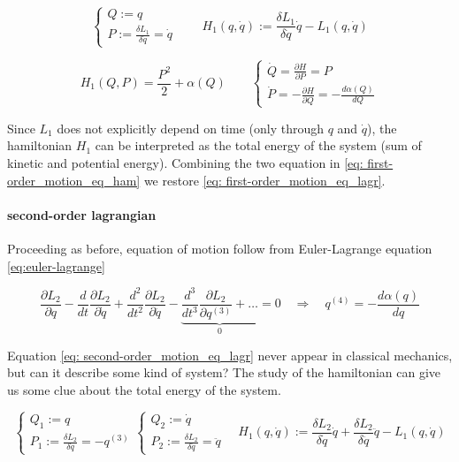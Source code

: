 \begin{equation*}
  \begin{cases}
    Q := q \\
    P := \frac{\delta L_1}{\delta \dot{q}} = \dot{q}
  \end{cases}
  \qquad
  H_1(q, \dot{q}) := \frac{\delta L_1}{\delta \dot{q}} \dot{q} - L_1(q, \dot{q})
\end{equation*}

\begin{equation} \label{eq: first-order_motion_eq_ham}
  H_1(Q, P) = \frac{P^2}{2} + \alpha(Q) \qquad
  \begin{cases}
    \dot{Q} =   \frac{\partial H}{\partial P} = P \\
    \dot{P} = - \frac{\partial H}{\partial Q} = - \frac{d\alpha(Q)}{dQ}
  \end{cases}
\end{equation}

Since $L_1$ does not explicitly depend on time (only through $q$ and $\dot{q}$),
the hamiltonian $H_1$ can be interpreted as the total energy of the system (sum of
kinetic and potential energy).  Combining the two equation in \eqref{eq:
first-order_motion_eq_ham} we restore \eqref{eq: first-order_motion_eq_lagr}.


\paragraph{second-order lagrangian} Proceeding as before, equation of motion
follow from Euler-Lagrange equation \eqref{eq:euler-lagrange}

\begin{equation} \label{eq: second-order_motion_eq_lagr}
  \frac{\partial L_2}{\partial q} -
  \frac{d}{dt}\frac{\partial L_2}{\partial \dot{q}} +
  \frac{d^2}{dt^2}\frac{\partial L_2}{\partial \ddot{q}} -
  \underbrace{
    \frac{d^3}{dt^3}\frac{\partial L_2}{\partial q^{(3)}} + \ldots
  }_0 = 0
  \quad \Rightarrow \quad
  q^{(4)} = - \frac{d\alpha(q)}{dq}
\end{equation}

Equation \eqref{eq: second-order_motion_eq_lagr} never appear in classical
mechanics, but can it describe some kind of system? The study of the hamiltonian
can give us some clue about the total energy of the system.

\begin{equation*}
  \begin{cases}
    Q_1 := q \\
    P_1 := \frac{\delta L_2}{\delta \dot{q}} = -q^{(3)}
  \end{cases}
  \begin{cases}
    Q_2 := \dot{q} \\
    P_2 := \frac{\delta L_2}{\delta \ddot{q}} = \ddot{q}
  \end{cases}
  \quad
  H_1(q, \dot{q}) :=
    \frac{\delta L_2}{\delta \dot{q}} \dot{q} +
    \frac{\delta L_2}{\delta \ddot{q}} \ddot{q} -
    L_1(q, \dot{q})
\end{equation*}

